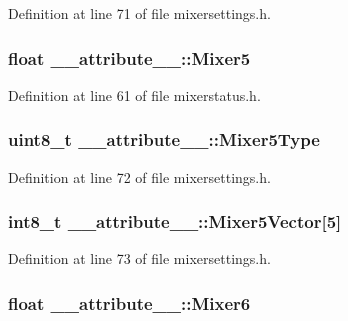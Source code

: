 \-Definition at line 71 of file mixersettings.\-h.

\hypertarget{struct____attribute_____a8007aef1411f2e75b3feaa1c4287d8e5}{
\subsubsection[{\-Mixer5}]{\setlength{\rightskip}{0pt plus 5cm}float {\bf \-\_\-\-\_\-attribute\-\_\-\-\_\-\-::\-Mixer5}}}\label{struct____attribute_____a8007aef1411f2e75b3feaa1c4287d8e5}


\-Definition at line 61 of file mixerstatus.\-h.

\hypertarget{struct____attribute_____a2fee87d5a2d5dfc03673d0a5322898e9}{
\subsubsection[{\-Mixer5\-Type}]{\setlength{\rightskip}{0pt plus 5cm}uint8\-\_\-t {\bf \-\_\-\-\_\-attribute\-\_\-\-\_\-\-::\-Mixer5\-Type}}}\label{struct____attribute_____a2fee87d5a2d5dfc03673d0a5322898e9}


\-Definition at line 72 of file mixersettings.\-h.

\hypertarget{struct____attribute_____a035273308b96d8a8dc419cbaa2982a4e}{
\subsubsection[{\-Mixer5\-Vector}]{\setlength{\rightskip}{0pt plus 5cm}int8\-\_\-t {\bf \-\_\-\-\_\-attribute\-\_\-\-\_\-\-::\-Mixer5\-Vector}\mbox{[}5\mbox{]}}}\label{struct____attribute_____a035273308b96d8a8dc419cbaa2982a4e}


\-Definition at line 73 of file mixersettings.\-h.

\hypertarget{struct____attribute_____a60e8a9e26ff74994a6774f093ed42714}{
\subsubsection[{\-Mixer6}]{\setlength{\rightskip}{0pt plus 5cm}float {\bf \-\_\-\-\_\-attribute\-\_\-\-\_\-\-::\-Mixer6}}}\label{struct____attribute_____a60e8a9e26ff74994a6774f093ed42714}


